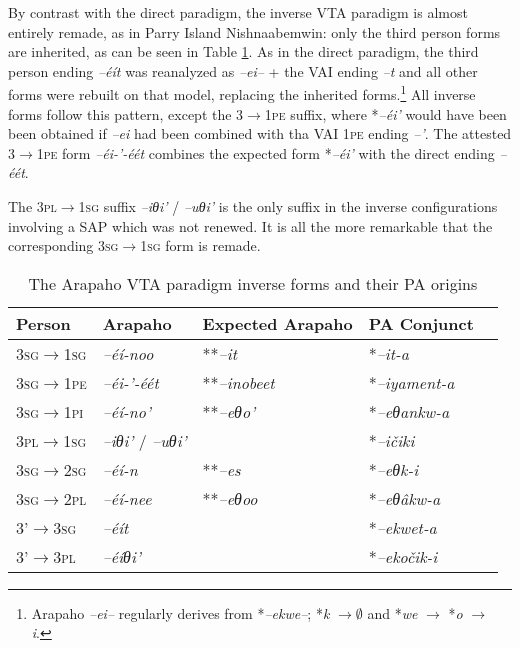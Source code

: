 \documentclass[twoside,a4paper,11pt]{article}
\newcommand{\ipa}[1]{{\phon\textit{#1}}}
\newcommand{\sg}{\textsc{sg}}
\newcommand{\pl}{\textsc{pl}}
\newcommand{\grise}[1]{\cellcolor{lightgray}\textbf{#1}}
\newcommand{\Σ}{\greek{Σ}}
\newcommand{\pli}{\textsc{pi}}
\newcommand{\pe}{\textsc{pe}}
\begin{document}
By contrast with the direct paradigm, the inverse VTA paradigm is almost entirely remade, as in Parry Island Nishnaabemwin: only the third person forms are inherited, as can be seen in Table \ref{tab:arapaho.vta.2}. As in the direct paradigm, the third person ending \ipa{--éít} was reanalyzed as \ipa{--ei--} + the VAI ending \ipa{--t} and all other forms were rebuilt on that model, replacing the inherited forms.\footnote{Arapaho \ipa{--ei--} regularly derives from *\ipa{--ekwe--}; *\ipa{k} $\rightarrow \emptyset $ and *\ipa{we} $\rightarrow $ *\ipa{o} $\rightarrow $ \ipa{i}. } All inverse forms follow this pattern, except the 3$\rightarrow$1\pe{} suffix, where *\ipa{--éi'} would have been been obtained if \ipa{--ei} had been combined with tha VAI 1\pe{} ending \ipa{--'}. The attested 3$\rightarrow$1\pe{} form \ipa{--éi-'-éét} combines the expected form *\ipa{--éi'} with the direct ending \ipa{--éét}.

The 3\pl{}$\rightarrow$1\sg{} suffix	 \ipa{--iθi'} /	\ipa{--uθi'} is the only  suffix in the inverse configurations involving a SAP which was not renewed. It is all the more remarkable that the corresponding 3\sg{}$\rightarrow$1\sg{} form is remade.

\begin{table}[H]
\caption{The Arapaho VTA paradigm inverse forms and their PA origins}
\centering \label{tab:arapaho.vta.2}
\begin{tabular}{lllll}
\toprule
Person & Arapaho & Expected Arapaho&PA Conjunct    \\
\midrule
3\sg{}$\rightarrow$1\sg{} & 	\ipa{--éí-noo}\grise{} &   **\ipa{--it}&	*\ipa{--it-a} & 		\\
3\sg{}$\rightarrow$1\pe{} & 	\ipa{--éi-'-éét} \grise{}&**\ipa{--inobeet}& *\ipa{--iyament-a} & 		\\
3\sg{}$\rightarrow$1\pli{} & 	\ipa{--éí-no'} \grise{}& 	**\ipa{--eθo'}&*\ipa{--eθankw-a} & 		\\
\midrule
3\pl{}$\rightarrow$1\sg{} & 	 \ipa{--iθi'} /	\ipa{--uθi'} &    &	*\ipa{--ičiki} & 		\\
\midrule
3\sg{}$\rightarrow$2\sg{} & 	\ipa{--éí-n} \grise{}&**\ipa{--es}& *\ipa{--eθk-i} & 		\\
3\sg{}$\rightarrow$2\pl{} & 	\ipa{--éí-nee} \grise{}& **\ipa{--eθoo}&*\ipa{--eθâkw-a} & 		\\
\midrule
3'$\rightarrow$3\sg{} & 	\ipa{--éít} & &	*\ipa{--ekwet-a} & 		\\
3'$\rightarrow$3\pl{} & 	\ipa{--éíθi'} & &	*\ipa{--ekočik-i} & 		\\
\bottomrule
\end{tabular}
\end{table}
\end{document}

